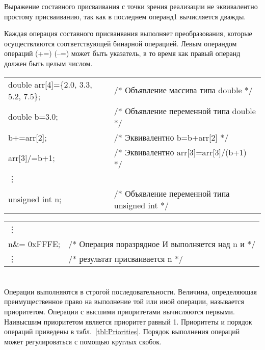 Выражение составного присваивания с точки зрения реализации не эквивалентно простому присваиванию, так как в последнем операнд1 вычисляется дважды. \killoverfullbefore

Каждая операция составного присваивания выполняет преобразования, которые осуществляются соответствующей бинарной операцией. Левым операндом операций (+=) ({--}=) может быть указатель, в то время как правый операнд должен быть целым числом. \killoverfullbefore \BL 

\begin{pExample}
\begin{tabular}{ l l }
double  arr[4]=\{2.0, 3.3, 5.2, 7.5\};
 & \textcolor{exComm}{/* Объявление массива типа double */} \\
double  b=3.0; & \textcolor{exComm}{/* Объявление переменной типа double */} \\
b+=arr[2]; & \textcolor{exComm}{/* Эквивалентно b=b+arr[2] */} \\
arr[3]/=b+1;  & \textcolor{exComm}{/* Эквивалентно arr[3]=arr[3]/(b+1) */} \\
\vdots & \textcolor{exComm}{ } \\
unsigned int n; & \textcolor{exComm}{/* Объявление переменной типа unsigned int */} \\
\end{tabular}

\begin{tabular}{ l l }
\vdots & \textcolor{exComm}{ } \\
n\&= 0xFFFE; & \textcolor{exComm}{ /* Операция поразрядное И выполняется над n и */} \\
\vdots & \textcolor{exComm}{ /* результат присваивается n */} \\
\end{tabular}
\end{pExample}

\section{}

Операции выполняются в строгой последовательности. Величина, определяющая преимущественное право на выполнение той или иной операции, называется приоритетом. Операции с высшими приоритетами вычисляются первыми. Наивысшим приоритетом является приоритет равный 1. Приоритеты и порядок операций приведены в табл.~\ref{tbl:Priorities}. Порядок выполнения операций может регулироваться с помощью круглых скобок. 

